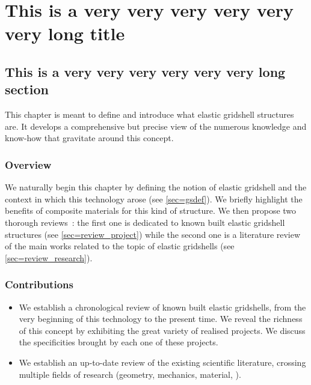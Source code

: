 
\newrefsegment
\chapter{This is a very very very very very very long title}

\section{This is a very very very very very very long section}

This chapter is meant to define and introduce what elastic gridshell structures are. It develops a comprehensive but precise view of the numerous knowledge and know-how that gravitate around this concept.

\subsection{Overview}
We naturally begin this chapter by defining the notion of elastic gridshell and the context in which this technology arose (see \cref{sec=gsdef}). We briefly highlight the benefits of composite materials for this kind of structure. We then propose two thorough reviews~: the first one is dedicated to known built elastic gridshell structures (see \cref{sec=review_project}) while the second one is a literature review of the main works related  to the topic of elastic gridshells (see \cref{sec=review_research}).

\subsection{Contributions}
\begin{itemize}
\item We establish a chronological review of known built elastic gridshells, from the very beginning of this technology to the present time. We reveal the richness of this concept by exhibiting the great variety of realised projects. We discuss the specificities brought by each one of these projects.
\item We establish an up-to-date review of the existing scientific literature, crossing multiple fields of research (geometry, mechanics, material, \telp{}).
\end{itemize}

